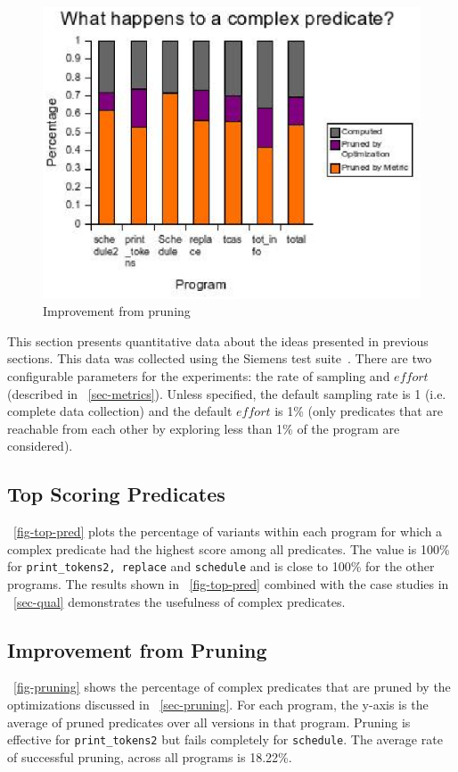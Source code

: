 \begin{figure}
  \centering
  \includegraphics[width=\columnwidth]{charts/pruning}
  \caption{Improvement from pruning}
  \label{fig-pruning}
\end{figure}

This section presents quantitative data about the ideas presented in previous sections.  This data was collected using the Siemens test suite~\cite{257766}.  There are two configurable parameters for the experiments: the rate of sampling and $effort$ (described in ~\autoref{sec-metrics}).  Unless specified, the default sampling rate is 1 (i.e. complete data collection) and the default $effort$ is 1\% (only predicates that are reachable from each other by exploring less than 1\% of the program are considered).

\subsection{Top Scoring Predicates}
~\autoref{fig-top-pred} plots the percentage of variants within each program for which a complex predicate had the highest score among all predicates.  The value is 100\% for \texttt{print\_tokens2, replace} and \texttt{schedule} and is close to 100\% for the other programs.  The results shown in ~\autoref{fig-top-pred} combined with the case studies in ~\autoref{sec-qual} demonstrates the usefulness of complex predicates.

\subsection{Improvement from Pruning}
~\autoref{fig-pruning} shows the percentage of complex predicates that are pruned by the optimizations discussed in ~\autoref{sec-pruning}.  For each program, the y-axis is the average of pruned predicates over all versions in that program.  Pruning is effective for \texttt{print\_tokens2} but fails completely for \texttt{schedule}.  The average rate of successful pruning, across all programs is 18.22\%.


